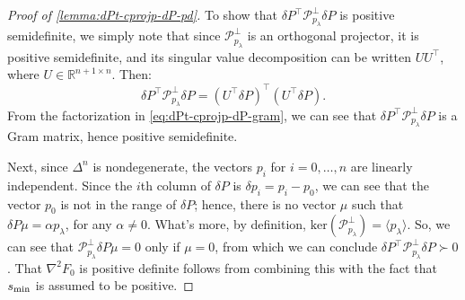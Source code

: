 \documentclass[eikonal.tex]{subfiles}
\begin{document}
\begin{proof}[Proof of \cref{lemma:dPt-cprojp-dP-pd}]
  To show that $\delta P^\top \mathcal{P}^\perp_{p_\lambda} \delta P$
  is positive semidefinite, we simply note that since
  $\mathcal{P}^\perp_{p_\lambda}$ is an orthogonal projector, it is
  positive semidefinite, and its singular value decomposition can be
  written $UU^\top$, where $U \in \mathbb{R}^{n+1 \times n}$. Then:
  \begin{equation}\label{eq:dPt-cprojp-dP-gram}
    \delta P^\top \mathcal{P}^\perp_{p_\lambda} \delta P = {(U^\top \delta P)}^\top {(U^\top \delta P)}.
  \end{equation}
  From the factorization in \cref{eq:dPt-cprojp-dP-gram}, we can see
  that $\delta P^\top \mathcal{P}^\perp_{p_\lambda} \delta P$ is a
  Gram matrix, hence positive semidefinite.

  Next, since $\Delta^n$ is nondegenerate, the vectors $p_i$ for
  $i = 0, \hdots, n$ are linearly independent. Since the $i$th column
  of $\delta P$ is $\delta p_i = p_i - p_0$, we can see that the
  vector $p_0$ is not in the range of $\delta P$; hence, there is no
  vector $\mu$ such that $\delta P \mu = \alpha p_\lambda$, for any
  $\alpha \neq 0$. What's more, by definition,
  $\text{ker}(\mathcal{P}_{p_\lambda}^\perp) = \langle p_\lambda
  \rangle$. So, we can see that
  $\mathcal{P}^\perp_{p_\lambda} \delta P \mu = 0$ only if $\mu = 0$,
  from which we can conclude
  $\delta P^\top \mathcal{P}^\perp_{p_\lambda} \delta P \succ 0$. That
  $\nabla^2 F_0$ is positive definite follows from combining this with
  the fact that $s_{\operatorname{min}}$ is assumed to be positive.
\end{proof}
\end{document}
